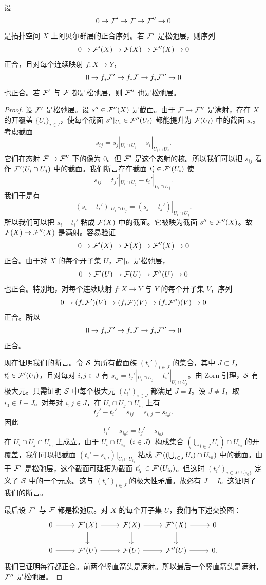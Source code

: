 \begin{lemma}\label{it:2.1.11}
设
\[
0\to\mathcal{F}'\to\mathcal{F}\to\mathcal{F}''\to 0
\]
是拓扑空间 $X$ 上阿贝尔群层的正合序列。若 $\mathcal{F}'$ 是松弛层，则序列
\[
0\to\mathcal{F}'(X)\to\mathcal{F}(X)\to\mathcal{F}''(X)\to 0
\]
正合，且对每个连续映射 $f\colon X\to Y$，
\[
0\to f_*\mathcal{F}'\to f_*\mathcal{F}\to f_*\mathcal{F}''\to 0
\]
也正合。若 $\mathcal{F}'$ 与 $\mathcal{F}$ 都是松弛层，则 $\mathcal{F}''$ 也是松弛层。
\end{lemma}
\begin{proof}
设 $\mathcal{F}'$ 是松弛层。设 $s''\in\mathcal{F}''(X)$ 是截面。由于 $\mathcal{F}\to\mathcal{F}''$ 是满射，存在 $X$ 的开覆盖 $\{U_i\}_{i\in I}$，使每个截面 $s''|_{U_i}\in\mathcal{F}''(U_i)$ 都能提升为 $\mathcal{F}(U_i)$ 中的截面 $s_i$。考虑截面
\[
s_{ij}=s_j|_{U_i\cap U_j}-s_i|_{U_i\cap U_j}.
\]
它们在态射 $\mathcal{F}\to\mathcal{F}''$ 下的像为 $0$。但 $\mathcal{F}'$ 是这个态射的核。所以我们可以把 $s_{ij}$ 看作 $\mathcal{F}'(U_i\cap U_j)$ 中的截面。我们断言存在截面 $t_i'\in\mathcal{F}'(U_i)$ 使
\[
s_{ij}=t_j'|_{U_i\cap U_j}-t_i'|_{U_i\cap U_j}.
\]
我们于是有
\[
(s_i-t_i')|_{U_i\cap U_j}=(s_j-t_j')|_{U_i\cap U_j}.
\]
所以我们可以把 $s_i-t_i'$ 粘成 $\mathcal{F}(X)$ 中的截面。它被映为截面 $s''\in\mathcal{F}''(X)$。故 $\mathcal{F}(X)\to\mathcal{F}''(X)$ 是满射。容易验证
\[
0\to\mathcal{F}'(X)\to\mathcal{F}(X)\to\mathcal{F}''(X)\to 0
\]
正合。由于对 $X$ 的每个开子集 $U$，$\mathcal{F}'|_U$ 是松弛层，
\[
0\to\mathcal{F}'(U)\to\mathcal{F}(U)\to\mathcal{F}''(U)\to 0
\]
也正合。特别地，对每个连续映射 $f\colon X\to Y$ 与 $Y$ 的每个开子集 $V$，序列
\[
0\to(f_*\mathcal{F}')(V)\to(f_*\mathcal{F})(V)\to(f_*\mathcal{F}'')(V)\to 0
\]
正合。所以
\[
0\to f_*\mathcal{F}'\to f_*\mathcal{F}\to f_*\mathcal{F}''\to 0
\]
正合。

现在证明我们的断言。令 $\mathcal{S}$ 为所有截面族 $(t_i')_{i\in J}$ 的集合，其中 $J\subset I$，$t_i'\in\mathcal{F}'(U_i)$，且对每对 $i,j\in J$ 有 $s_{ij}=t_j'|_{U_i\cap U_j}-t_i'|_{U_i\cap U_j}$。由 Zorn 引理，$\mathcal{S}$ 有极大元。只需证明 $\mathcal{S}$ 中每个极大元 $(t_i')_{i\in J}$ 都满足 $J=I$。设 $J\ne I$，取 $i_0\in I-J$。对每对 $i,j\in J$，在 $U_i\cap U_j\cap U_{i_0}$ 上有
\[
t_j'-t_i'=s_{ij}=s_{i_0 j}-s_{i_0 i}.
\]
因此
\[
t_i'-s_{i_0 i}=t_j'-s_{i_0 j}
\]
在 $U_i\cap U_j\cap U_{i_0}$ 上成立。由于 $U_i\cap U_{i_0}$（$i\in J$）构成集合 $(\bigcup_{i\in J}U_i)\cap U_{i_0}$ 的开覆盖，我们可以把截面 $(t_i'-s_{i_0 i})|_{U_i\cap U_{i_0}}$ 粘成 $\mathcal{F}'((\bigcup_{i\in J}U_i)\cap U_{i_0})$ 中的截面。由于 $\mathcal{F}'$ 是松弛层，这个截面可延拓为截面 $t_{i_0}'\in\mathcal{F}'(U_{i_0})$。但这时 $(t_i')_{i\in J\cup\{i_0\}}$ 定义了 $\mathcal{S}$ 中的一个元素。这与 $(t_i')_{i\in J}$ 的极大性矛盾。故必有 $J=I$。这证明了我们的断言。

最后设 $\mathcal{F}'$ 与 $\mathcal{F}$ 都是松弛层。对 $X$ 的每个开子集 $U$，我们有下述交换图：
\[\begin{tikzcd}[column sep=2.6em,row sep=1.8em]
0 \arrow[r] & \cF'(X) \arrow[r] \arrow[d] & \cF(X) \arrow[r] \arrow[d] & \cF''(X) \arrow[r] \arrow[d] & 0 \\
0 \arrow[r] & \cF'(U) \arrow[r] & \cF(U) \arrow[r] & \cF''(U) \arrow[r] & 0.
\end{tikzcd}\]
我们已证明每行都正合。前两个竖直箭头是满射。所以最后一个竖直箭头是满射，$\mathcal{F}''$ 是松弛层。
\end{proof}

